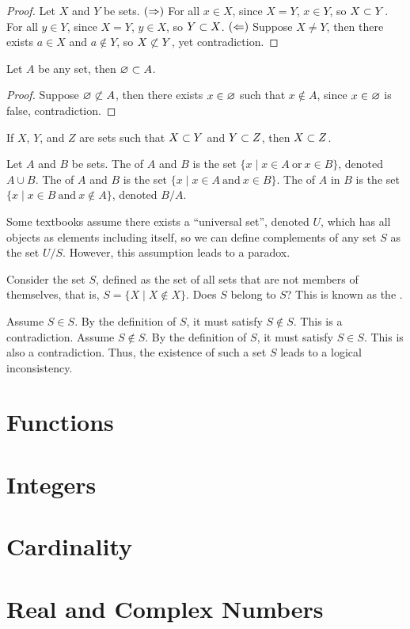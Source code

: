 \documentclass[10pt]{article}
\begin{document}
\begin{proof}
    Let $X$ and $Y$ be sets. $(\Rightarrow)$ For all $x\in X$, since $X=Y$, $x\in Y$, so $X\subset Y$. For all $y\in Y$, since $X=Y$, $y\in X$, so $Y\subset X$. $(\Leftarrow)$ Suppose $X\ne Y$, then there exists $a\in X$ and $a\notin Y$, so $X\nsub Y$, yet contradiction. 
\end{proof}
\begin{proposition}
    Let $A$ be any set, then $\varnothing\subset A$.
\end{proposition}
\begin{proof}
    Suppose $\es\nsub A$, then there exists $x\in\varnothing$ such that $x\notin A$, since $x\in\varnothing$ is false, contradiction.
\end{proof}
\begin{example}
    If $X$, $Y$, and $Z$ are sets such that $X\subset Y$ and $Y\subset Z$, then $X\subset Z$.
\end{example}
\begin{definition}
    Let $A$ and $B$ be sets. The  of $A$ and $B$ is the set $\{x\mid x\in A\ \text{or}\ x\in B\}$, denoted $A\cup B$. The  of $A$ and $B$ is the set $\{x\mid x\in A\ \text{and}\ x\in B\}$. The  of $A$ in $B$ is the set $\{x\mid x\in B\ \text{and}\ x\notin A\}$, denoted $B/A$.
\end{definition}
\par
Some textbooks assume there exists a ``universal set'', denoted $U$, which has all objects as elements including itself, so we can define complements of any set $S$ as the set $U/S$. However, this assumption leads to a paradox. 
\begin{example}
    Consider the set $S$, defined as the set of all sets that are not members of themselves, that is, $S=\{X\mid X\notin X\}$. Does $S$ belong to $S$? This is known as the .
\end{example}
\par
Assume $S\in S$. By the definition of $S$, it must satisfy $S\notin S$. This is a contradiction. Assume $S \notin S$. By the definition of $S$, it must satisfy $S\in S$. This is also a contradiction. Thus, the existence of such a set $S$ leads to a logical inconsistency. 








\newpage
\section{Functions}
\section{Integers}
\section{Cardinality}
\section{Real and Complex Numbers}




 





\hindex
\end{document}
